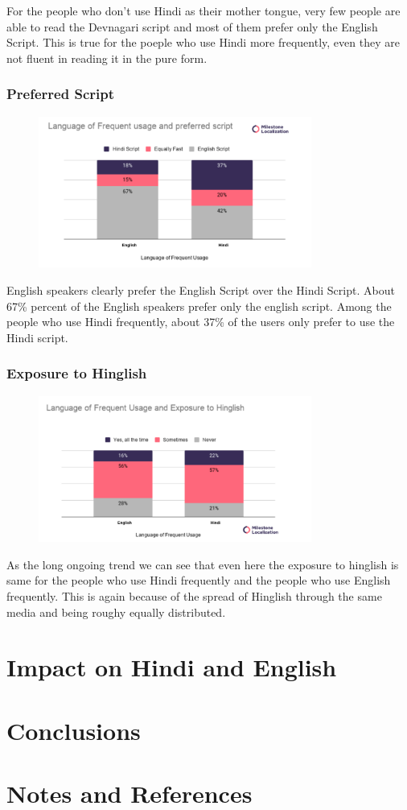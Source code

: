 \documentclass{article}
\begin{document}
For the people who don't use Hindi as their mother tongue, very few people are able to read the Devnagari script and most of them prefer only the English Script. This is true for the poeple who use Hindi more frequently, even they are not fluent in reading it in the pure form.

\subsubsection{Preferred Script}

\begin{figure}[H]
    \centering
    \includegraphics[width=0.8\textwidth]{plots/frequent_preferred_script.png}
\end{figure}

English speakers clearly prefer the English Script over the Hindi Script. About 67\% percent of the English speakers prefer only the english script. Among the people who use Hindi frequently, about 37\% of the users only prefer to use the Hindi script. 

\subsubsection{Exposure to Hinglish}

\begin{figure}[H]
    \centering
    \includegraphics[width=0.8\textwidth]{plots/frequent_exposure.png}
\end{figure}
As the long ongoing trend we can see that even here the exposure to hinglish is same for the people who use Hindi frequently and the people who use English frequently. This is again because of the spread of Hinglish through the same media and being roughy equally distributed. 

\section{Impact on Hindi and English}


\section{Conclusions}

\section{Notes and References}
\end{document}
